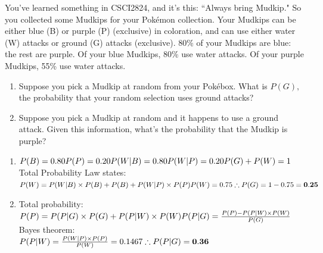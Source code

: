 \documentclass[11pt]{amsart}
\newcommand{\be}{\begin{enumerate}}
\newcommand{\ee}{\end{enumerate}}
\begin{document}
\item You've learned something in CSCI2824, and it's this: ``Always bring Mudkip."  So you collected some Mudkips for your Pok\'emon collection.  Your Mudkips can be either blue (B) or purple (P) (exclusive) in coloration, and can use either water (W) attacks or ground (G) attacks (exclusive).  80\% of your Mudkips are blue: the rest are purple.  Of your blue Mudkips, 80\% use water attacks.  Of your purple Mudkips, 55\% use water attacks.
\be
\item Suppose you pick a Mudkip at random from your Pok\'ebox.  What is $P(G),$ the probability that your random selection uses ground attacks?
\item Suppose you pick a Mudkip at random and it happens to use a ground attack.  Given this information, what's the probability that the Mudkip is purple?
\ee
	\begin{sol}
		\be
			\item $P(B) = 0.80\\
			P(P) = 0.20\\
			P(W|B) = 0.80\\
			P(W|P) = 0.20\\
			P(G) + P(W) = 1$\\
			Total Probability Law states:\\
			$P(W) = P(W|B) \times P(B) + P(B) + P(W|P) \times P(P)\\
			P(W) = 0.75
			\therefore P(G) = 1 - 0.75 = \mathbf{0.25}$

			\item Total probability:\\
			$P(P) = P(P|G) \times P(G) + P(P|W) \times P(W)\\
			P(P|G) = \frac{P(P) - P(P|W) \times P(W)}{P(G)}\\$
			Bayes theorem:\\
			$P(P|W) = \frac{P(W|P) \times P(P)}{P(W)} = 0.1467\\
			\therefore P(P|G) = \mathbf{0.36}$
		\ee
	\end{sol}
\end{document}
